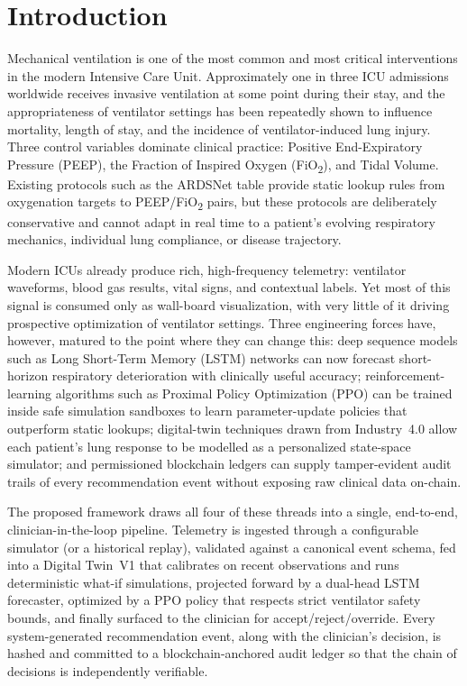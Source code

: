 \documentclass[12pt,a4paper,oneside]{report}
\begin{document}
\section{Introduction}
Mechanical ventilation is one of the most common and most critical interventions in the modern Intensive Care Unit. Approximately one in three ICU admissions worldwide receives invasive ventilation at some point during their stay, and the appropriateness of ventilator settings has been repeatedly shown to influence mortality, length of stay, and the incidence of ventilator-induced lung injury. Three control variables dominate clinical practice: Positive End-Expiratory Pressure (PEEP), the Fraction of Inspired Oxygen (FiO\textsubscript{2}), and Tidal Volume. Existing protocols such as the ARDSNet table provide static lookup rules from oxygenation targets to PEEP/FiO\textsubscript{2} pairs, but these protocols are deliberately conservative and cannot adapt in real time to a patient's evolving respiratory mechanics, individual lung compliance, or disease trajectory.

Modern ICUs already produce rich, high-frequency telemetry: ventilator waveforms, blood gas results, vital signs, and contextual labels. Yet most of this signal is consumed only as wall-board visualization, with very little of it driving prospective optimization of ventilator settings. Three engineering forces have, however, matured to the point where they can change this: deep sequence models such as Long Short-Term Memory (LSTM) networks can now forecast short-horizon respiratory deterioration with clinically useful accuracy; reinforcement-learning algorithms such as Proximal Policy Optimization (PPO) can be trained inside safe simulation sandboxes to learn parameter-update policies that outperform static lookups; digital-twin techniques drawn from Industry~4.0 allow each patient's lung response to be modelled as a personalized state-space simulator; and permissioned blockchain ledgers can supply tamper-evident audit trails of every recommendation event without exposing raw clinical data on-chain.

The proposed framework draws all four of these threads into a single, end-to-end, clinician-in-the-loop pipeline. Telemetry is ingested through a configurable simulator (or a historical replay), validated against a canonical event schema, fed into a Digital Twin~V1 that calibrates on recent observations and runs deterministic what-if simulations, projected forward by a dual-head LSTM forecaster, optimized by a PPO policy that respects strict ventilator safety bounds, and finally surfaced to the clinician for accept/reject/override. Every system-generated recommendation event, along with the clinician's decision, is hashed and committed to a blockchain-anchored audit ledger so that the chain of decisions is independently verifiable.
\end{document}
